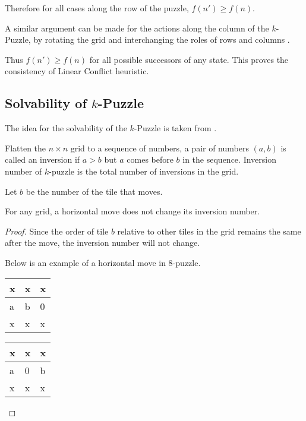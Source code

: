 \documentclass{llncs}
\begin{document}
Therefore for all cases along the row of the puzzle, $f(n') \geq f(n)$. 

A similar argument can be made for the actions along the column of the $k$-Puzzle, by rotating the grid and interchanging the roles of rows and columns .

Thus $f(n') \geq f(n)$ for all possible successors of any state. This proves the consistency of Linear Conflict heuristic.

\subsection{Solvability of $k$-Puzzle}
The idea for the solvability of the $k$-Puzzle is taken from \cite{solvable}.
\begin{definition}
Flatten the $n \times n$ grid to a sequence of numbers, a pair of numbers $(a,b)$ is called an inversion if $a>b$ but $a$ comes before $b$ in the sequence. Inversion number of $k$-puzzle is the total number of inversions in the grid.
\end{definition}

Let $b$ be the number of the tile that moves.

\begin{lemma}
For any grid, a horizontal move does not change its inversion number.
\end{lemma}

\begin{proof}
Since the order of tile $b$ relative to other tiles in the grid remains the same after the move, the inversion number will not change.

Below is an example of a horizontal move in $8$-puzzle.
\begin{table}
	\centering
	\label{tab1}
	\begin{tabular}{|p{2mm}|p{2mm}|p{2mm}|} \hline
	x & x & x\\ \hline
	a & b & 0\\ \hline
	x & x & x\\ \hline
	\end{tabular}
\end{table}
\begin{table}
	\centering
	\label{tab2}
	\begin{tabular}{|p{2mm}|p{2mm}|p{2mm}|} \hline
	x & x & x\\ \hline
	a & 0 & b\\ \hline
	x & x & x\\ \hline
	\end{tabular}
\end{table}
\end{proof}
\end{document}
